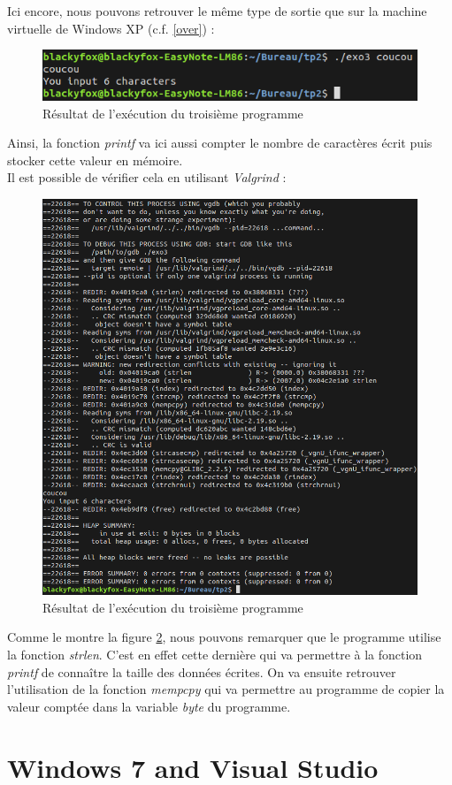 Ici encore, nous pouvons retrouver le même type de sortie que sur la machine virtuelle de Windows XP (c.f. \ref{over}) :
\begin{figure}[H]
  \centering
  \includegraphics[width=.9\textwidth]{img/c4.png}
  \caption{Résultat de l'exécution du troisième programme} 
  \label{img:li:4}
\end{figure}
Ainsi, la fonction \textit{printf} va ici aussi compter le nombre de caractères écrit puis stocker cette valeur en mémoire.\\
Il est possible de vérifier cela en utilisant \textit{Valgrind} :
\begin{figure}[H]
  \centering
  \includegraphics[width=.9\textwidth]{img/c5.png}
  \caption{Résultat de l'exécution du troisième programme} 
  \label{img:li:5}
\end{figure}
Comme le montre la figure \ref{img:li:5}, nous pouvons remarquer que le programme utilise la fonction \textit{strlen}. C'est en effet cette dernière qui va permettre à la fonction \textit{printf} de connaître la taille des données écrites. On va ensuite retrouver l'utilisation de la fonction \textit{mempcpy} qui va permettre au programme de copier la valeur comptée dans la variable \textit{byte} du programme.

\section{Windows 7 and Visual Studio}